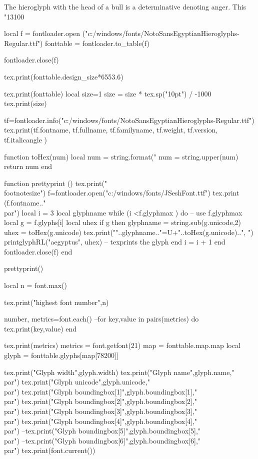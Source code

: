 \documentclass{article}
\begin{document}
\def\hieroprint#1{{\large\luadirect{parse(#1)}}}

The hieroglyph \hieroprint{"F2-F3!"} with the head of a bull is a determinative denoting anger. This {{\color{blue}\hiero \char"13100}}

\begin{luacode*}
local f = fontloader.open
("c:/windows/fonts/NotoSansEgyptianHieroglyphs-Regular.ttf")
fonttable = fontloader.to_table(f)

fontloader.close(f)


tex.print(fonttable.design_size*6553.6)

tex.print(fonttable)
local size=1
size = size * tex.sp("10pt") / -1000
tex.print(size)

tf=fontloader.info("c:/windows/fonts/NotoSansEgyptianHieroglyphs-Regular.ttf")
tex.print(tf.fontname,
          tf.fullname,
          tf.familyname,
          tf.weight,
          tf.version,
          tf.italicangle
         )

function toHex(num)
  local  num  = string.format("%
         num  = string.upper(num)
  return num
end

function prettyprint ()
    tex.print("\\footnotesize")
    f=fontloader.open("c:/windows/fonts/JSeshFont.ttf")
    tex.print (f.fontname.."\\par")
    local i = 3
    local glyphname
	while (i <f.glyphmax ) do -- use f.glyphmax 
		local g = f.glyphs[i]
		local uhex
		if g then
      		glyphname = string.sub(g.unicode,2) 
 	   		uhex = toHex(g.unicode)
 			tex.print(""..glyphname.."=U+"..toHex(g.unicode)..", ")
 			printglyphRL("aegyptus", uhex) -- texprints the glyph
		end
  		i = i + 1
	end
	fontloader.close(f)
end

prettyprint()

local n = font.max()

tex.print("highest font number",n)

number, metrics=font.each()
--for key,value in pairs(metrics) do tex.print(key,value) end

tex.print(metrics)
metrics = font.getfont(21)
map = fonttable.map.map
local glyph = fonttable.glyphs[map[78200]]

tex.print("Glyph width",glyph.width)
tex.print("Glyph name",glyph.name,"\\par")
tex.print("Glyph unicode",glyph.unicode,"\\par")
tex.print("Glyph boundingbox[1]",glyph.boundingbox[1],"\\par")
tex.print("Glyph boundingbox[2]",glyph.boundingbox[2],"\\par")
tex.print("Glyph boundingbox[3]",glyph.boundingbox[3],"\\par")
tex.print("Glyph boundingbox[4]",glyph.boundingbox[4],"\\par")
--tex.print("Glyph boundingbox[5]",glyph.boundingbox[5],"\\par")
--tex.print("Glyph boundingbox[6]",glyph.boundingbox[6],"\\par")
tex.print(font.current())


\end{luacode*}
\end{document}
